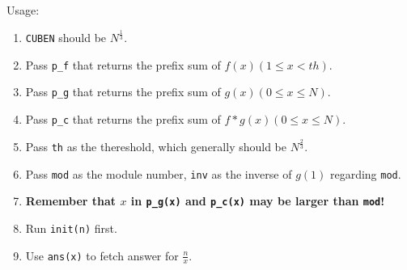 Usage:
\begin{enumerate}
	\item \texttt{CUBEN} should be $N^{\frac{1}{3}}$.
	\item Pass \texttt{p\_f} that returns the prefix sum of $f(x)(1\le x<th)$.
	\item Pass \texttt{p\_g} that returns the prefix sum of $g(x)(0\le x\le N)$.
	\item Pass \texttt{p\_c} that returns the prefix sum of $f*g(x)(0\le x\le N)$.
	\item Pass \texttt{th} as the thereshold, which generally should be $N^{\frac{2}{3}}$.
	\item Pass \texttt{mod} as the module number, \texttt{inv} as the inverse of $g(1)$ regarding \texttt{mod}.
	\item \textbf{Remember that $x$ in \texttt{p\_g(x)} and \texttt{p\_c(x)} may be larger than \texttt{mod}!}
	\item Run \texttt{init(n)} first.
	\item Use \texttt{ans(x)} to fetch answer for $\frac{n}{x}$.
\end{enumerate}


